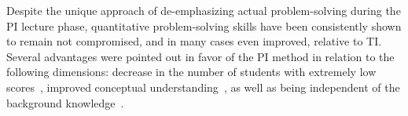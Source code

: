 \documentclass[twocolumn,secnumarabic,amssymb, nobibnotes, aps, prd]{revtex4-2}
\begin{document}
%
    
    Despite the unique approach of de-emphasizing actual problem-solving during the PI lecture phase, quantitative problem-solving skills have been consistently shown to remain not compromised, and in many cases even improved, relative to TI.
    Several advantages were pointed out in favor of the PI method in relation to the following dimensions: decrease in the number of students with extremely low scores~\cite{crouch2001peer,lasry2008peer,thacker1994comparing}, improved conceptual understanding~\cite{crouch2001peer}, as well as being independent of the background knowledge~\cite{lasry2008peer,tobias1990they}.



\end{document}
